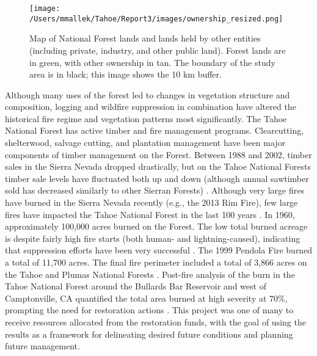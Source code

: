 \begin{figure}[!htbp]
\centering
\texttt{[image: /Users/mmallek/Tahoe/Report3/images/ownership\_resized.png]}
\caption{Map of National Forest lands and lands held by other entities (including private, industry, and other public land). Forest lands are in green, with other ownership in tan. The boundary of the study area is in black; this image shows the 10 km buffer.} 
\label{ownership}
\end{figure}

Although many uses of the forest led to changes in vegetation structure and composition, logging and wildfire suppression in combination have altered the historical fire regime and vegetation patterns most significantly. The Tahoe National Forest has active timber and fire management programs. Clearcutting, shelterwood, salvage cutting, and plantation management have been major components of timber management on the Forest. Between 1988 and 2002, timber sales in the Sierra Nevada dropped drastically, but on the Tahoe National Forests timber sale levels have fluctuated both up and down (although annual sawtimber sold has decreased similarly to other Sierran Forests) \citep{USDAForestService2004}. Although very large fires have burned in the Sierra Nevada recently (e.g., the 2013 Rim Fire), few large fires have impacted the Tahoe National Forest in the last 100 years \citep{USDAForestService1990}. In 1960, approximately 100,000 acres burned on the Forest. The low total burned acreage is despite fairly high fire starts (both human- and lightning-caused), indicating that suppression efforts have been very successful \citep{USDAForestService1990}. The 1999 Pendola Fire burned a total of 11,700 acres. The final fire perimeter included a total of 3,866 acres on the Tahoe and Plumas National Forests \citep{Shaw2009,USDOJ2009}. Post-fire analysis of the burn in the Tahoe National Forest around the Bullards Bar Reservoir and west of Camptonville, CA quantified the total area burned at high severity at 70\%, prompting the need for restoration actions \citep{USDAForestService1999}. This project was one of many to receive resources allocated from the restoration funds, with the goal of using the results as a framework for delineating desired future conditions and planning future management.






